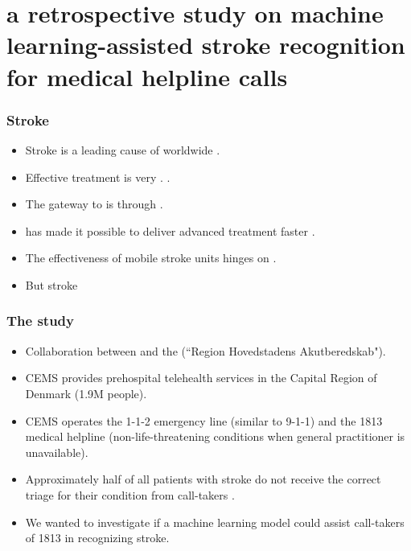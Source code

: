 
\section[A Retrospective Study on Machine Learning-Assisted Stroke Recognition for Medical Helpline Calls]{a retrospective study on machine learning-assisted stroke recognition\\ for medical helpline calls}


\begin{frame}
    \frametitle{Stroke}
    \begin{itemize}
        \item Stroke is a leading cause of  worldwide \parencite{cite1,cite2,cite3}.
        \item Effective treatment is very . \parencite{cite4,cite5}.
        \item The gateway to  is through .
        \item {} has made it possible to deliver advanced treatment faster \parencite{cite6,cite7}.
        \item The effectiveness of mobile stroke units hinges on  \parencite{cite6,cite7}.
        \item But stroke 
    \end{itemize}
\end{frame}


\begin{frame}
    \frametitle{The study}
    \begin{itemize}
        \item Collaboration between  and the  (``Region Hovedstadens Akutberedskab").
        \item CEMS provides prehospital telehealth services in the Capital Region of Denmark (1.9M people).
        \item CEMS operates the 1-1-2 emergency line (similar to 9-1-1) and the 1813 medical helpline (non-life-threatening conditions when general practitioner is unavailable).
        \item Approximately half of all patients with stroke do not receive the correct triage for their condition from call-takers \parencite{cite10,cite11,cite12}. 
        \vspace{1em}
        \item We wanted to investigate if a machine learning model could assist call-takers of 1813 in recognizing stroke.
    \end{itemize}
\end{frame}



